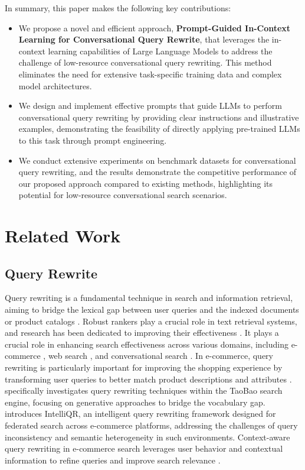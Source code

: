 In summary, this paper makes the following key contributions:
\begin{itemize}
\item We propose a novel and efficient approach, \textbf{Prompt-Guided In-Context Learning for Conversational Query Rewrite}, that leverages the in-context learning capabilities of Large Language Models to address the challenge of low-resource conversational query rewriting. This method eliminates the need for extensive task-specific training data and complex model architectures.
\item We design and implement effective prompts that guide LLMs to perform conversational query rewriting by providing clear instructions and illustrative examples, demonstrating the feasibility of directly applying pre-trained LLMs to this task through prompt engineering.
\item We conduct extensive experiments on benchmark datasets for conversational query rewriting, and the results demonstrate the competitive performance of our proposed approach compared to existing methods, highlighting its potential for low-resource conversational search scenarios.
\end{itemize}


\section{Related Work}

\subsection{Query Rewrite}

Query rewriting is a fundamental technique in search and information retrieval, aiming to bridge the lexical gap between user queries and the indexed documents or product catalogs \cite{TaoBaoQR2022}.  Robust rankers play a crucial role in text retrieval systems, and research has been dedicated to improving their effectiveness \cite{zhou2023towards}.  It plays a crucial role in enhancing search effectiveness across various domains, including e-commerce \cite{TaoBaoQR2022, ContextAwareQR2023}, web search \cite{GraphBasedQR2007}, and conversational search \cite{SimpleMultiQR2024}. In e-commerce, query rewriting is particularly important for improving the shopping experience by transforming user queries to better match product descriptions and attributes \cite{TaoBaoQR2022, IntelliQR2024, ContextAwareQR2023}. \cite{TaoBaoQR2022} specifically investigates query rewriting techniques within the TaoBao search engine, focusing on generative approaches to bridge the vocabulary gap. \cite{IntelliQR2024} introduces IntelliQR, an intelligent query rewriting framework designed for federated search across e-commerce platforms, addressing the challenges of query inconsistency and semantic heterogeneity in such environments. Context-aware query rewriting in e-commerce search leverages user behavior and contextual information to refine queries and improve search relevance \cite{ContextAwareQR2023}.

